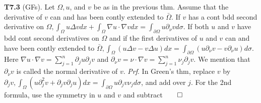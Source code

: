 {\bf T7.3} (GFs). Let $\Omega, u$, and $v$ be as in the previous thm. Assume that the derivative of $v$ can and has been contly extended to $\bar{\Omega}$. If $v$ has a cont bdd second derivative on $\Omega, \int_{\Omega} u \Delta v dx + \int_{\Omega} \nabla u \cdot \nabla v dx = \int_{\partial \Omega} u \partial_{\nu} v d \sigma$. If both $u$ and $v$ have bdd cont second derivatives on $\Omega$ and if the first derivatives of $u$ and $v$ can and have been contly extended to $\bar{\Omega}, \int_{\Omega} (u \Delta v - v \Delta u)dx = \int_{\partial \Omega} (u \partial_{\nu} v - v \partial_{\nu} u) d \sigma$. Here $\nabla u \cdot \nabla v = \sum_{j=1}^n \partial_j u \partial_j v$ and $\partial_{\nu}v = \nu \cdot \nabla v = \sum_{j=1}^n \nu_j \partial_j v$. We mention that $\partial_{\nu} v$ is called the normal derivative of $v$. {\it Prf}. In Green's thm, replace $v$ by $\partial_j v, \int_{\Omega} (u \partial_j^2 v + \partial_j v \partial_j u)dx = \int_{\partial \Omega} u \partial_j v \nu_j d \sigma$, and add over $j$. For the 2nd formula, use the symmetry in $u$ and $v$ and subtract$\qed$
